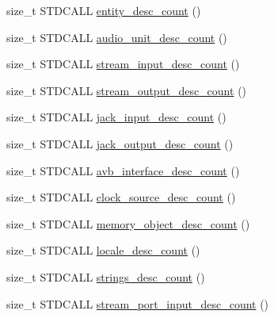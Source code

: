 \begin{DoxyCompactItemize}
\item 
size\+\_\+t S\+T\+D\+C\+A\+LL \hyperlink{classavdecc__lib_1_1configuration__descriptor__imp_a644ad4750f4dbb93a86345be02feab68}{entity\+\_\+desc\+\_\+count} ()
\item 
size\+\_\+t S\+T\+D\+C\+A\+LL \hyperlink{classavdecc__lib_1_1configuration__descriptor__imp_a7de1667162e1907a60c25bc54ca3d622}{audio\+\_\+unit\+\_\+desc\+\_\+count} ()
\item 
size\+\_\+t S\+T\+D\+C\+A\+LL \hyperlink{classavdecc__lib_1_1configuration__descriptor__imp_a5e5922d5e6e30b23a51f80733b04f354}{stream\+\_\+input\+\_\+desc\+\_\+count} ()
\item 
size\+\_\+t S\+T\+D\+C\+A\+LL \hyperlink{classavdecc__lib_1_1configuration__descriptor__imp_a4c90e4e01e0b1366029c2d68e27da922}{stream\+\_\+output\+\_\+desc\+\_\+count} ()
\item 
size\+\_\+t S\+T\+D\+C\+A\+LL \hyperlink{classavdecc__lib_1_1configuration__descriptor__imp_a54572016ecdf07fae690d76dca2bcee4}{jack\+\_\+input\+\_\+desc\+\_\+count} ()
\item 
size\+\_\+t S\+T\+D\+C\+A\+LL \hyperlink{classavdecc__lib_1_1configuration__descriptor__imp_a7ececf1c69192a1a63f1b1084a7311f5}{jack\+\_\+output\+\_\+desc\+\_\+count} ()
\item 
size\+\_\+t S\+T\+D\+C\+A\+LL \hyperlink{classavdecc__lib_1_1configuration__descriptor__imp_a916353d9dff83ac05fc98126349d0d77}{avb\+\_\+interface\+\_\+desc\+\_\+count} ()
\item 
size\+\_\+t S\+T\+D\+C\+A\+LL \hyperlink{classavdecc__lib_1_1configuration__descriptor__imp_a23e7315fde1ab9785d6f826eb3703776}{clock\+\_\+source\+\_\+desc\+\_\+count} ()
\item 
size\+\_\+t S\+T\+D\+C\+A\+LL \hyperlink{classavdecc__lib_1_1configuration__descriptor__imp_aa487f4c1ac61390497fe90261b13000e}{memory\+\_\+object\+\_\+desc\+\_\+count} ()
\item 
size\+\_\+t S\+T\+D\+C\+A\+LL \hyperlink{classavdecc__lib_1_1configuration__descriptor__imp_a55fe76a40c5d1dd2277718ce8fff1407}{locale\+\_\+desc\+\_\+count} ()
\item 
size\+\_\+t S\+T\+D\+C\+A\+LL \hyperlink{classavdecc__lib_1_1configuration__descriptor__imp_ad452b26571257bbcc0abe7d1ac860324}{strings\+\_\+desc\+\_\+count} ()
\item 
size\+\_\+t S\+T\+D\+C\+A\+LL \hyperlink{classavdecc__lib_1_1configuration__descriptor__imp_ac49aa0e8fd155da8b442c1fdfd548b9d}{stream\+\_\+port\+\_\+input\+\_\+desc\+\_\+count} ()
\item 

\end{DoxyCompactItemize}

